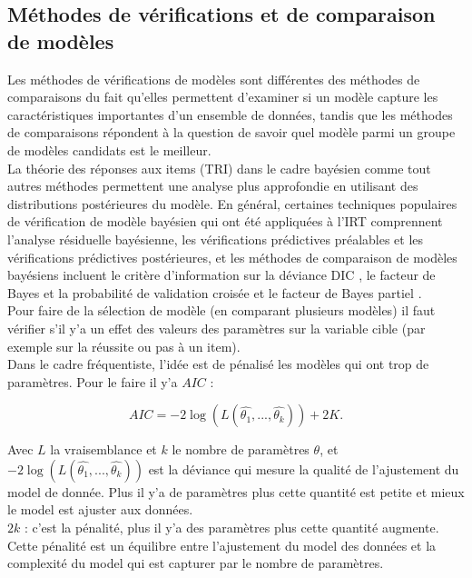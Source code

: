 \subsection{Méthodes de vérifications et de comparaison de modèles}
Les méthodes de vérifications de modèles sont différentes des méthodes de comparaisons du fait qu’elles permettent d'examiner si un modèle capture les caractéristiques importantes d'un ensemble de données, tandis que les méthodes de comparaisons répondent à la question de savoir quel modèle parmi un groupe de modèles candidats est le meilleur. \\
La théorie des réponses aux items (TRI) dans le cadre bayésien comme tout autres méthodes permettent une analyse plus approfondie en utilisant des distributions postérieures du modèle. En général, certaines techniques populaires de vérification de modèle bayésien qui ont été appliquées à l'IRT comprennent l'analyse résiduelle bayésienne, les vérifications prédictives préalables et les vérifications prédictives postérieures, et les méthodes de comparaison de modèles bayésiens incluent le critère d'information sur la déviance DIC \cite{spiegelhalter2003bayesian}, le facteur de Bayes \cite{kass1995bayes} et la probabilité de validation croisée et le facteur de Bayes partiel \cite{o1995fractional}. \\
Pour faire de la sélection de modèle (en comparant plusieurs modèles) il faut vérifier s’il y’a un effet des valeurs des paramètres sur la variable cible (par exemple sur la réussite ou pas à un item). \\
Dans le cadre fréquentiste, l’idée est de pénalisé les modèles qui ont trop de paramètres. Pour le faire il y’a \(\displaystyle AIC \)  :

\begin{equation}
	AIC = -2 \log (L(\widehat{\theta_{1}},...,\widehat{\theta_{k}} )) + 2K.
	\label{aic_formula}
\end{equation}

Avec \(\displaystyle L \) la vraisemblance et \(\displaystyle k \) le nombre de paramètres \(\displaystyle \theta \), et \\
\(\displaystyle -2 \log (L(\widehat{\theta_{1}},...,\widehat{\theta_{k}} )) \) est la déviance qui mesure la qualité de l’ajustement du model de donnée. Plus il y’a de paramètres plus cette quantité est petite et mieux le model est ajuster aux données. \\
\(\displaystyle 2k \) : c’est la pénalité, plus il y’a des paramètres plus cette quantité augmente. Cette pénalité est un équilibre entre l’ajustement du model des données et la complexité du model qui est capturer par le nombre de paramètres. \\ \\

